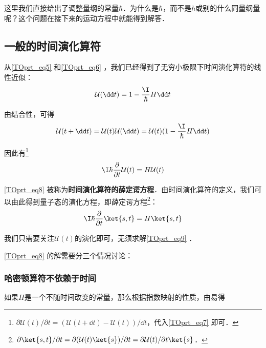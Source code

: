 这里我们直接给出了调整量纲的常量$\hbar$．为什么是$\hbar$，而不是$h$或别的什么同量纲量呢？这个问题在接下来的运动方程中就能得到解答．



\subsection{一般的时间演化算符}

从\autoref{TOprt_eq5} 和\autoref{TOprt_eq6} ，我们已经得到了无穷小极限下时间演化算符的线性近似：
\begin{equation}
\mathcal{U}(\dd t)=1-\frac{\I}{\hbar}H \dd t
\end{equation}

由结合性，可得
\begin{equation}\label{TOprt_eq7}
\mathcal{U}(t+\dd t) = \mathcal{U}(t)\mathcal{U}(\dd t) = \mathcal{U}(t)(1-\frac{\I}{\hbar}H \dd t)
\end{equation}

因此有\footnote{$\partial\mathcal{U}(t)/\partial t=(\mathcal{U}(t+\dd t)-\mathcal{U}(t))/\dd t$，代入\autoref{TOprt_eq7} 即可．}
\begin{equation}\label{TOprt_eq8}
\I\hbar\frac{\partial}{\partial t}\mathcal{U}(t) = H\mathcal{U}(t)
\end{equation}


\autoref{TOprt_eq8} 被称为\textbf{时间演化算符的薛定谔方程}．由时间演化算符的定义，我们可以由此得到量子态的演化方程，即薛定谔方程\footnote{$\partial\ket{s, t}/\partial t=\partial(\mathcal{U}(t)\ket{s})/\partial t=\partial \mathcal{U}(t)/\partial t \ket{s}$．}：
\begin{equation}\label{TOprt_eq9}
\I\hbar\frac{\partial}{\partial t}\ket{s, t} = H\ket{s, t}
\end{equation}


我们只需要关注$\mathcal{U}(t)$的演化即可，无须求解\autoref{TOprt_eq9} ．

\autoref{TOprt_eq8} 的解需要分三个情况讨论：


\subsubsection{哈密顿算符不依赖于时间}

如果$H$是一个不随时间改变的常量，那么根据指数映射的性质，由易得























